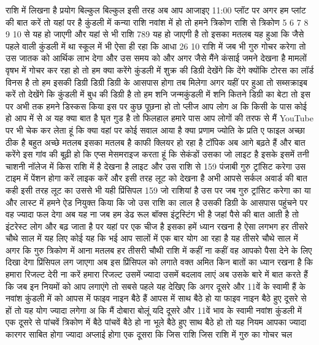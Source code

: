 राशि में लिखना है प्रयोग बिल्कुल बिल्कुल इसी तरह अब आप आजाइए 11:00 प्लॉट पर अगर
हम प्लांट की बात करें तो यहां पर है
कुंडली में कन्या राशि नवांश में हो तो
हमने त्रिकोण राशि से त्रिकोण 5 6 7 8 9
10 से यह हो जाएगी और यहां से भी राशि 789 यह हो जाएगी
है तो इसका मतलब यह हुआ कि जैसे पहले वाली कुंडली में था स्कूल में भी ऐसा ही रहा कि आधा 26 10 राशि में जब भी गुरु गोचर करेगा
तो उस जातक को आर्थिक लाभ देगा और उस समय को और अगर जैसे मैंने कंसाई जमने देखना है
मामलों वृषभ में गोचर कर रहा हो तो हम क्या करेंगे कुंडली में शुक्र की डिग्री देखेंगे कि देंगे क्योंकि टोरस का लॉर्ड
विनस है तो हम इसकी डिग्री डिग्री डिग्री के आसपास होगा तब मिलेगा अगर यहीं पर हुआ
तो सब्सक्राइब करें तो देखेंगे कि कुंडली में बुध की डिग्री है तो हम शनि
जन्मकुंडली में शनि कितने डिग्री का बेटा तो इस पर अभी तक हमने डिस्कस किया इस पर
कुछ पूछना हो तो प्लीज आप लोग अ कि किसी के पास कोई हो आप में से अ
यह क्या बात है घृत गुड है तो फिलहाल हमारे पास आप लोगों की तरफ
से मैं YouTube पर भी चेक कर लेता हूं कि क्या वहां पर कोई सवाल आया है क्या प्रणाम
ज्योति के प्रति ए फाइल
अच्छा ठीक है बहुत अच्छे मतलब इसका मतलब है काफी क्लियर हो रहा है टॉपिक अब आगे
बढ़ते हैं और बात करेंगे इस गांव की बूढ़ी हो
कि एप्स मेसमराइज करता हूं कि सेकंडों उसका जो लाइट है इसके इसमें तनी चाशनी
नॉलेज में किस राशि में है देखना है लाइट और उस राशि से 159 पंजाबी गुरु ट्रांसिट
करेगा उस टाइम में पेंशन होगा करें लाइक करें और इसी तरह लूट को देखना है अभी आपसे
सर्कल अवार्ड की बात कही इसी तरह लूट का उससे भी यही प्रिंसिपल 159 जो राशियां है
उस पर जब गुरु ट्रांसिट करेगा का या और लास्ट में हमने ऐड नियुक्त किया कि जो उस
राशि का लाल है उसकी डिग्री के आसपास पहुंचने पर वह ज्यादा फल देगा अब यह ना जब
हम डेढ रूल बॉक्स इंट्रस्टिंग भी है जहां पैसे की बात आती है तो इंटरेस्ट लोग और बढ़ जाता है पर यहां पर एक चीज है इसका
हमें ध्यान रखना है ऐसा लगभग हर तीसरे चौथे साल में यह
लिए कोई यह कि भई आप सालों में एक बार योग आ रहा है यह तीसरे चौथे साल में अगर कि गुरु त्रिकोण में आना मतलब हर तीसरी चौथी
राशि में कहीं ना कहीं वह आपको पैसा देने के लिए दिखा देगा प्रिंसिपल लग जाएगा अब इस प्रिंसिपल को लगाते वक्त अमित किन
बातों का ध्यान रखना है कि हमारा रिजल्ट देरी ना करें हमारा रिजल्ट उसमें ज्यादा उसमें बदलाव लाएं अब उसके बारे में बात करते हैं
कि जब इन नियमों को आप लगाएंगे तो सबसे पहले यह देखिए कि अगर दूसरे और 11वें के
स्वामी हैं के नवांश कुंडली में को आपस में फाइव नाइन बैठे हैं आपस में
साथ बैठे हो या फाइव नाइन बैठे हुए दूसरे से हों तो यह योग ज्यादा लगेगा अ
कि मैं दोबारा बोलूं यदि दूसरे और 11वें भाव के स्वामी नवांश कुंडली में एक दूसरे
से पांचवें त्रिकोण में बैठे पांचवें बैठे हो ना भूले बैठे हुए साथ बैठे हो तो यह नियम आपका ज्यादा कारगर साबित होगा ज्यादा
अप्लाई होगा एक दूसरा कि जिस राशि जिस राशि में गुरु का गोचर चल
